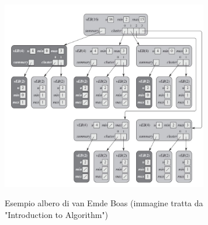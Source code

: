 \documentclass{article}
\begin{document}
\begin{figure}[h!]
    \begin{center}
    \includegraphics[width=9cm]{vEB.jpg}\\
    \caption{Esempio albero di van Emde Boas (immagine tratta da "Introduction to Algorithm")}
    \end{center}
\end{figure}
\end{document}
